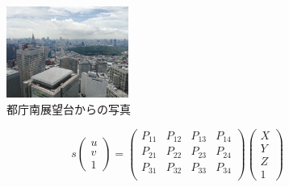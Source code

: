 \documentclass[11pt,a4j]{jsarticle}
\begin{document}
    \begin{figure}[H]
      \centering
      \includegraphics[clip,width=4.0cm]{img/metro.jpg}
      \caption{都庁南展望台からの写真\label{fig:cute}}
    \end{figure}

    \begin{equation}
        s\left(
        \begin{array}{c}
            u \\
            v \\
            1
        \end{array}
        \right) =
        \left(
    \begin{array}{cccc}
      P_{11} & P_{12} & P_{13} & P_{14}\\
      P_{21} & P_{22} & P_{23} & P_{24} \\
      P_{31} & P_{32} & P_{33} & P_{34} \\
    \end{array}
        \right)
        \left(
        \begin{array}{c}
            X \\
            Y \\
            Z \\
            1
        \end{array}
        \right)
        \label{eq:projection_matrix}
    \end{equation}
\end{document}
